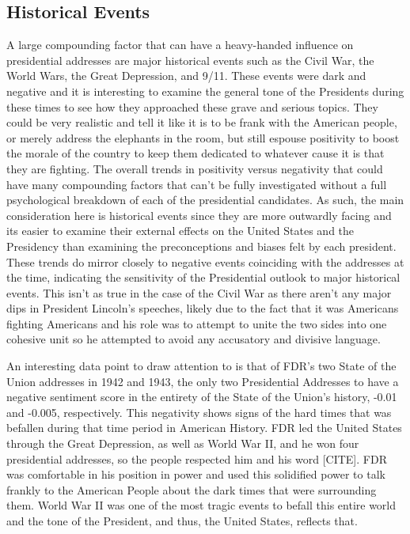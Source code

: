 \subsection{Historical Events}
A large compounding factor that can have a heavy-handed influence on presidential addresses are major historical events such as the Civil War, the World Wars, the Great Depression, and 9/11.
These events were dark and negative and it is interesting to examine the general tone of the Presidents during these times to see how they approached these grave and serious topics.
They could be very realistic and tell it like it is to be frank with the American people, or merely address the elephants in the room, but still espouse positivity to boost the morale of the country to keep them dedicated to whatever cause it is that they are fighting.
The overall trends in positivity versus negativity that could have many compounding factors that can't be fully investigated without a full psychological breakdown of each of the presidential candidates.
As such, the main consideration here is historical events since they are more outwardly facing and its easier to examine their external effects on the United States and the Presidency than examining the preconceptions and biases felt by each president.
These trends do mirror closely to negative events coinciding with the addresses at the time, indicating the sensitivity of the Presidential outlook to major historical events.
This isn't as true in the case of the Civil War as there aren't any major dips in President Lincoln's speeches, likely due to the fact that it was Americans fighting Americans and his role was to attempt to unite the two sides into one cohesive unit so he attempted to avoid any accusatory and divisive language.

An interesting data point to draw attention to is that of FDR's two State of the Union addresses in 1942 and 1943, the only two Presidential Addresses to have a negative sentiment score in the entirety of the State of the Union's history, -0.01 and -0.005, respectively.
This negativity shows signs of the hard times that was befallen during that time period in American History.
FDR led the United States through the Great Depression, as well as World War II, and he won four presidential addresses, so the people respected him and his word [CITE].
FDR was comfortable in his position in power and used this solidified power to talk frankly to the American People about the dark times that were surrounding them.
World War II was one of the most tragic events to befall this entire world and the tone of the President, and thus, the United States, reflects that.

